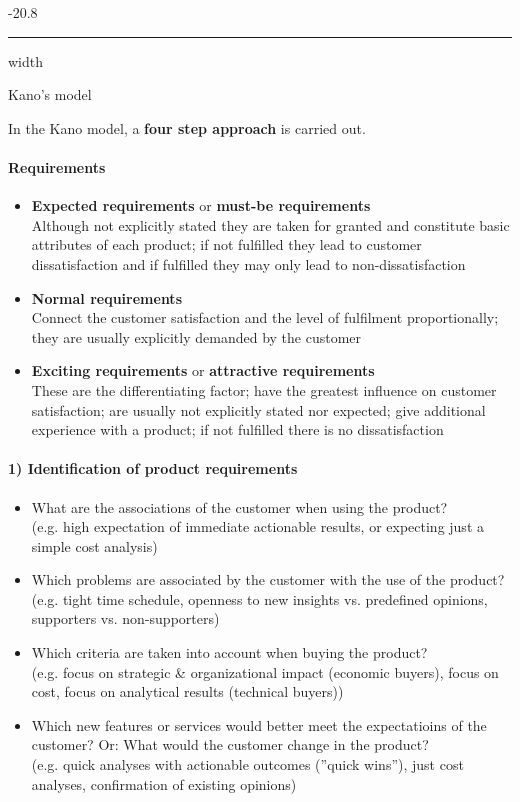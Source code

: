 \documentclass[a4paper, landscape, 6pt, fleqn]{scrartcl}
\makeatletter
\renewcommand{\emph}[1]{\textbf{#1}}
\renewcommand{\subsubsection}{\@startsection{subsubsection}{1}{0mm}%
{-2\baselineskip}{0.8\baselineskip}%
{\hrule depth 0.2pt width\columnwidth\vspace*{1.2em}\normalsize\bfseries}}
\makeatother
\begin{document}
\begin{multicols*}{4}
\subsubsection{Kano's model}

In the Kano model, a \emph{four step approach} is carried out.

\paragraph{Requirements}

\begin{itemize}
\item \emph{Expected requirements} or \emph{must-be requirements} \\
Although not explicitly stated they are taken for granted and constitute basic attributes of each product; if not fulfilled they lead to customer dissatisfaction and if fulfilled they may only lead to non-dissatisfaction
\item \emph{Normal requirements} \\
Connect the customer satisfaction and the level of fulfilment proportionally; they are usually explicitly demanded by the customer
\item \emph{Exciting requirements} or \emph{attractive requirements} \\
These are the differentiating factor; have the greatest influence on customer satisfaction; are usually not explicitly stated nor expected; give additional experience with a product; if not fulfilled there is no dissatisfaction
\end{itemize}

\paragraph{1) Identification of product requirements}

\begin{itemize}
\item What are the associations of the customer when using the product? \\
(e.g. high expectation of immediate actionable results, or expecting just a simple cost analysis)
\item Which problems are associated by the customer with the use of the product? \\
(e.g. tight time schedule, openness to new insights vs. predefined opinions, supporters vs. non-supporters)
\item Which criteria are taken into account when buying the product? \\
(e.g. focus on strategic \& organizational impact (economic buyers), focus on cost, focus on analytical results (technical buyers))
\item Which new features or services would better meet the expectatioins of the customer? Or: What would the customer change in the product? \\
(e.g. quick analyses with actionable outcomes (''quick wins''), just cost analyses, confirmation of existing opinions)
\end{itemize}


\end{multicols*}
\end{document}
